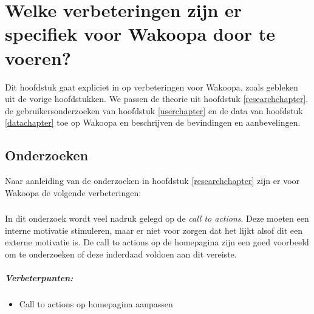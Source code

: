\documentclass[a4paper, 10pt, pdftex]{report}
\begin{document}
  \newpage
  \chapter{Welke verbeteringen zijn er specifiek voor Wakoopa door te voeren?}
    \newpage

    Dit hoofdstuk gaat expliciet in op verbeteringen voor Wakoopa, zoals gebleken uit de vorige hoofdstukken. We passen de theorie uit hoofdstuk \ref{researchchapter}, de gebruikersonderzoeken van hoofdstuk \ref{userchapter} en de data van hoofdstuk \ref{datachapter} toe op Wakoopa en beschrijven de bevindingen en aanbevelingen.

    \section{Onderzoeken}
    Naar aanleiding van de onderzoeken in hoofdstuk \ref{researchchapter} zijn er voor Wakoopa de volgende verbeteringen:

 \subsection{\cite{Beenen2004}}
      In dit onderzoek wordt veel nadruk gelegd op de \emph{call to actions}. Deze moeten een interne motivatie stimuleren, maar er niet voor zorgen dat het lijkt alsof dit een externe motivatie is. De call to actions op de homepagina zijn een goed voorbeeld om te onderzoeken of deze inderdaad voldoen aan dit vereiste.

      \paragraph{\textbf{Verbeterpunten:}}
      \begin{itemize}
        \item Call to actions op homepagina aanpassen
      \end{itemize}
\end{document}
